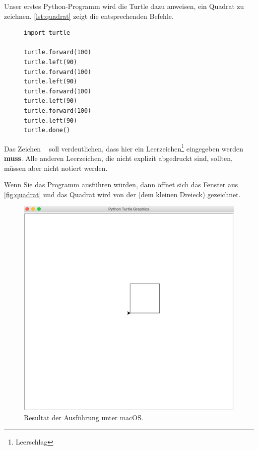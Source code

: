 \begin{example}

    Unser erstes Python-Programm wird die Turtle dazu anweisen, ein Quadrat zu zeichnen.
    \autoref{lst:quadrat} zeigt die entsprechenden Befehle.


    \begin{figure}[H]
        \centering
        \begin{lstlisting}[language={python3}, caption={Befehle für ein Quadrat (\graybgtexttt{quadrat.py}).}, label={lst:quadrat}]
import turtle

turtle.forward(100)
turtle.left(90)
turtle.forward(100)
turtle.left(90)
turtle.forward(100)
turtle.left(90)
turtle.forward(100)
turtle.left(90)
turtle.done()

\end{lstlisting}
\end{figure}

\begin{hinweis}
    Das Zeichen \lstinline[language={python3}]{ } soll verdeutlichen, dass hier ein Leerzeichen\footnote{Leerschlag} eingegeben werden \textbf{muss}.
    Alle anderen Leerzeichen, die nicht explizit abgedruckt sind, sollten, müssen aber nicht notiert werden.
\end{hinweis}

Wenn Sie das Programm ausführen würden, dann öffnet sich das Fenster aus \autoref{fig:quadrat} und das Quadrat wird von der  (dem kleinen Dreieck) gezeichnet.

\begin{figure}[htb]
    \centering
    \includegraphics[scale=0.25]{quadrat}
    \caption{Resultat der Ausführung unter macOS.\protect\footnotemark}
    \label{fig:quadrat}
\end{figure}

\end{example}

